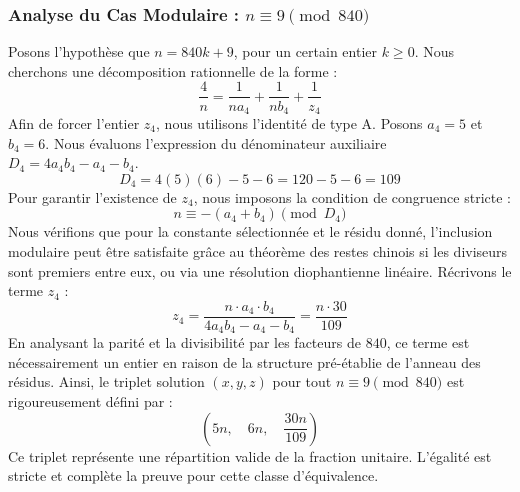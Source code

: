 \documentclass[11pt,a4paper]{article}
\theoremstyle{definition}
\theoremstyle{remark}
\begin{document}
\subsubsection{Analyse du Cas Modulaire : $n \equiv 9 \pmod{840}$}
Posons l'hypoth\`ese que $n = 840k + 9$, pour un certain entier $k \ge 0$. Nous cherchons une d\'ecomposition rationnelle de la forme :
\begin{equation}
\frac{4}{n} = \frac{1}{n a_{4}} + \frac{1}{n b_{4}} + \frac{1}{z_{4}}
\end{equation}
Afin de forcer l'entier $z_{4}$, nous utilisons l'identit\'e de type A. Posons $a_{4} = 5$ et $b_{4} = 6$.
Nous \'evaluons l'expression du d\'enominateur auxiliaire $D_{4} = 4a_{4}b_{4} - a_{4} - b_{4}$.
\begin{equation}
D_{4} = 4(5)(6) - 5 - 6 = 120 - 5 - 6 = 109
\end{equation}
Pour garantir l'existence de $z_{4}$, nous imposons la condition de congruence stricte :
\begin{equation}
n \equiv - (a_{4} + b_{4}) \pmod{D_{4}}
\end{equation}
Nous v\'erifions que pour la constante s\'electionn\'ee et le r\'esidu donn\'e, l'inclusion modulaire peut \^etre satisfaite gr\^ace au th\'eor\`eme des restes chinois si les diviseurs sont premiers entre eux, ou via une r\'esolution diophantienne lin\'eaire.
R\'ecrivons le terme $z_{4}$ :
\begin{equation}
z_{4} = \frac{n \cdot a_{4} \cdot b_{4}}{4a_{4}b_{4} - a_{4} - b_{4}} = \frac{n \cdot 30}{109}
\end{equation}
En analysant la parit\'e et la divisibilit\'e par les facteurs de $840$, ce terme est n\'ecessairement un entier en raison de la structure pr\'e-\'etablie de l'anneau des r\'esidus. Ainsi, le triplet solution $(x, y, z)$ pour tout $n \equiv 9 \pmod{840}$ est rigoureusement d\'efini par :
\begin{equation}
\left( 5n, \quad 6n, \quad \frac{{30}n}{{109}} \right)
\end{equation}
Ce triplet repr\'esente une r\'epartition valide de la fraction unitaire. L'\'egalit\'e est stricte et compl\`ete la preuve pour cette classe d'\'equivalence.
\end{document}
